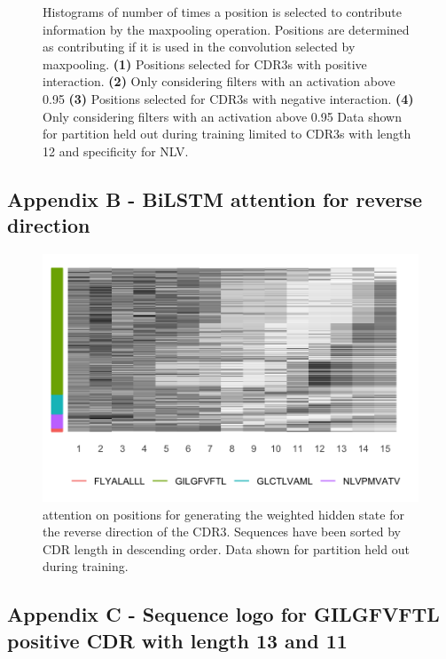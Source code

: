 \begin{figure}[H]
\caption{Histograms of number of times a position is selected to contribute information by the maxpooling operation. Positions are determined as contributing if it is used in the convolution selected by maxpooling. \textbf{(1)} Positions selected for CDR3s with positive interaction. \textbf{(2)} Only considering filters with an activation above 0.95 \textbf{(3)} Positions selected for CDR3s with negative interaction. \textbf{(4)} Only considering filters with an activation above 0.95 Data shown for partition held out during training limited to CDR3s with length 12 and specificity for NLV.}
\end{figure}

\newpage
\subsection*{Appendix B - BiLSTM attention for reverse direction}

\begin{figure}[H]
    \centering
    \includegraphics[width=\linewidth]{figures/attention_results/att_cdr3a_r.png}
    \caption{attention on positions for generating the weighted hidden state for the reverse direction of the CDR3{\textalpha}. Sequences have been sorted by CDR length in descending order. Data shown for partition held out during training.}
    \label{fig:att_cdr3a_r}
\end{figure}

\newpage
\subsection*{Appendix C - Sequence logo for GILGFVFTL positive CDR{\textalpha} with length 13 and 11}

